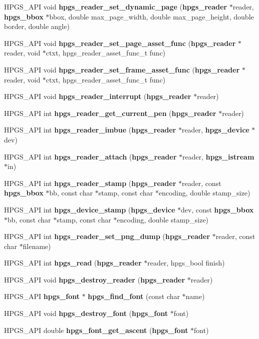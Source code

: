 \begin{DoxyCompactItemize}
\item 
HPGS\_\-API void {\bf hpgs\_\-reader\_\-set\_\-dynamic\_\-page} ({\bf hpgs\_\-reader} $\ast$reader, {\bf hpgs\_\-bbox} $\ast$bbox, double max\_\-page\_\-width, double max\_\-page\_\-height, double border, double angle)
\item 
HPGS\_\-API void {\bf hpgs\_\-reader\_\-set\_\-page\_\-asset\_\-func} ({\bf hpgs\_\-reader} $\ast$reader, void $\ast$ctxt, hpgs\_\-reader\_\-asset\_\-func\_\-t func)
\item 
HPGS\_\-API void {\bf hpgs\_\-reader\_\-set\_\-frame\_\-asset\_\-func} ({\bf hpgs\_\-reader} $\ast$reader, void $\ast$ctxt, hpgs\_\-reader\_\-asset\_\-func\_\-t func)
\item 
HPGS\_\-API void {\bf hpgs\_\-reader\_\-interrupt} ({\bf hpgs\_\-reader} $\ast$reader)
\item 
HPGS\_\-API int {\bf hpgs\_\-reader\_\-get\_\-current\_\-pen} ({\bf hpgs\_\-reader} $\ast$reader)
\item 
HPGS\_\-API int {\bf hpgs\_\-reader\_\-imbue} ({\bf hpgs\_\-reader} $\ast$reader, {\bf hpgs\_\-device} $\ast$dev)
\item 
HPGS\_\-API int {\bf hpgs\_\-reader\_\-attach} ({\bf hpgs\_\-reader} $\ast$reader, {\bf hpgs\_\-istream} $\ast$in)
\item 
HPGS\_\-API int {\bf hpgs\_\-reader\_\-stamp} ({\bf hpgs\_\-reader} $\ast$reader, const {\bf hpgs\_\-bbox} $\ast$bb, const char $\ast$stamp, const char $\ast$encoding, double stamp\_\-size)
\item 
HPGS\_\-API int {\bf hpgs\_\-device\_\-stamp} ({\bf hpgs\_\-device} $\ast$dev, const {\bf hpgs\_\-bbox} $\ast$bb, const char $\ast$stamp, const char $\ast$encoding, double stamp\_\-size)
\item 
HPGS\_\-API int {\bf hpgs\_\-reader\_\-set\_\-png\_\-dump} ({\bf hpgs\_\-reader} $\ast$reader, const char $\ast$filename)
\item 
HPGS\_\-API int {\bf hpgs\_\-read} ({\bf hpgs\_\-reader} $\ast$reader, hpgs\_\-bool finish)
\item 
HPGS\_\-API void {\bf hpgs\_\-destroy\_\-reader} ({\bf hpgs\_\-reader} $\ast$reader)
\item 
HPGS\_\-API {\bf hpgs\_\-font} $\ast$ {\bf hpgs\_\-find\_\-font} (const char $\ast$name)
\item 
HPGS\_\-API void {\bf hpgs\_\-destroy\_\-font} ({\bf hpgs\_\-font} $\ast$font)
\item 
HPGS\_\-API double {\bf hpgs\_\-font\_\-get\_\-ascent} ({\bf hpgs\_\-font} $\ast$font)

\end{DoxyCompactItemize}
